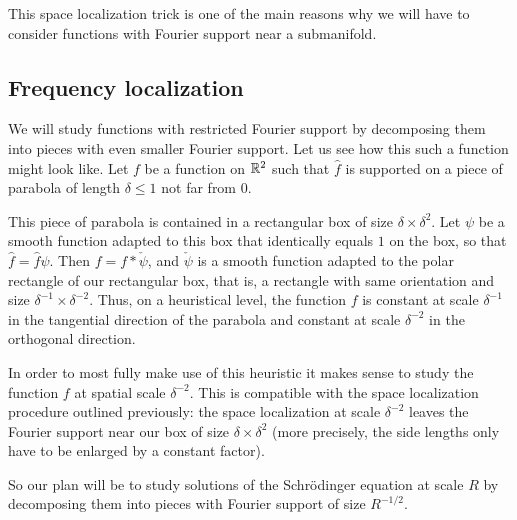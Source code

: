 This space localization trick is one of the main reasons why we will have to consider functions with Fourier support near a submanifold.

\subsection{Frequency localization}
We will study functions with restricted Fourier support by decomposing them into pieces with even smaller Fourier support.
Let us see how this such a function might look like.
Let $f$ be a function on $\mathbb{R}^{2}$ such that $\widehat{f}$ is supported on a piece of parabola of length $\delta \leq 1$ not far from $0$.
\begin{center}
\end{center}
This piece of parabola is contained in a rectangular box of size $\delta \times \delta^{2}$.
Let $\psi$ be a smooth function adapted to this box that identically equals $1$ on the box, so that $\widehat{f} = \widehat{f} \psi$.
Then $f = f * \check{\psi}$, and $\check \psi$ is a smooth function adapted to the polar rectangle of our rectangular box, that is, a rectangle with same orientation and size $\delta^{-1} \times \delta^{-2}$.
Thus, on a heuristical level, the function $f$ is constant at scale $\delta^{-1}$ in the tangential direction of the parabola and constant at scale $\delta^{-2}$ in the orthogonal direction.

In order to most fully make use of this heuristic it makes sense to study the function $f$ at spatial scale $\delta^{-2}$.
This is compatible with the space localization procedure outlined previously: the space localization at scale $\delta^{-2}$ leaves the Fourier support near our box of size $\delta \times \delta^{2}$ (more precisely, the side lengths only have to be enlarged by a constant factor).

So our plan will be to study solutions of the Schr\"odinger equation at scale $R$ by decomposing them into pieces with Fourier support of size $R^{-1/2}$.
